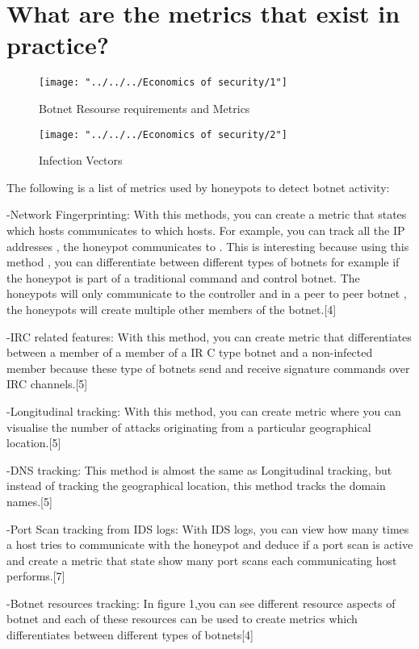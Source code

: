 \documentclass[a4paper]{article}
\author{}
\begin{document}
	
\section{What are the metrics that exist in practice?}
\begin{figure}
\centering
\texttt{[image: "../../../Economics of security/1"]}
\caption{Botnet Resourse requirements and Metrics}
\label{fig:1}
\end{figure}
\begin{figure}
\centering
\texttt{[image: "../../../Economics of security/2"]}
\caption{Infection Vectors}
\label{fig:2}
\end{figure}


The following is a list of metrics used by honeypots to detect botnet activity:

-Network Fingerprinting:
With this methods,  you can create a metric that states which hosts communicates to which hosts. For example, you can track all the IP addresses , the honeypot communicates to	. This is interesting because using this method , you can differentiate between different types of botnets for example if  the honeypot is part of a traditional command and control botnet. The honeypots will only communicate to the controller and  in a peer to peer botnet , the honeypots will create multiple other members of the botnet.[4]

-IRC related features:
With this method, you can create metric that differentiates between a member of a member of a IR C type botnet and a non-infected member because these type of botnets  send and receive signature commands over IRC channels.[5]

-Longitudinal tracking:
With this method, you can create metric where you can visualise the number of attacks originating from a particular geographical location.[5]

-DNS tracking:
This method is almost the same as Longitudinal tracking, but instead of tracking the geographical location, this method tracks the domain names.[5]

-Port  Scan tracking from IDS logs:
With IDS logs, you can view how many times a host tries to communicate with the honeypot and deduce if a port scan is active and create a metric that state show many port scans each communicating host performs.[7]

-Botnet resources tracking:
In figure 1,you can see different resource aspects of botnet and each of these resources can be used to create metrics which differentiates between different types of botnets[4]
\end{document}
